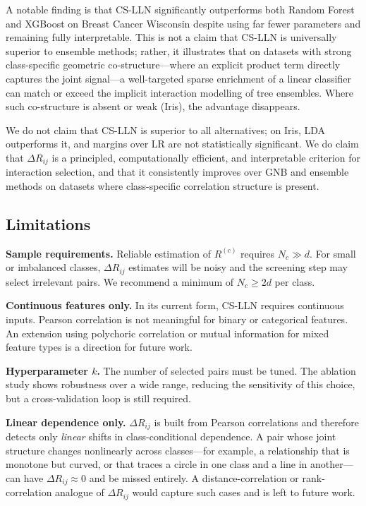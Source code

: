 \documentclass[conference]{IEEEtran}
\begin{document}
A notable finding is that CS-LLN significantly outperforms both Random
Forest and XGBoost on Breast Cancer Wisconsin despite using far fewer
parameters and remaining fully interpretable.
This is not a claim that CS-LLN is universally superior to ensemble methods;
rather, it illustrates that on datasets with strong class-specific geometric
co-structure---where an explicit product term directly captures the joint
signal---a well-targeted sparse enrichment of a linear classifier can match
or exceed the implicit interaction modelling of tree ensembles.
Where such co-structure is absent or weak (Iris), the advantage disappears.

We do not claim that CS-LLN is superior to all alternatives; on Iris, LDA
outperforms it, and margins over LR are not statistically significant.
We do claim that $\Delta R_{ij}$ is a principled, computationally efficient,
and interpretable criterion for interaction selection, and that it
consistently improves over GNB and ensemble methods on datasets where
class-specific correlation structure is present.

\subsection{Limitations}

\noindent\textbf{Sample requirements.}
Reliable estimation of $R^{(c)}$ requires $N_c \gg d$.
For small or imbalanced classes, $\Delta R_{ij}$ estimates will be noisy
and the screening step may select irrelevant pairs.
We recommend a minimum of $N_c \ge 2d$ per class.

\noindent\textbf{Continuous features only.}
In its current form, CS-LLN requires continuous inputs.
Pearson correlation is not meaningful for binary or categorical features.
An extension using polychoric correlation or mutual information for mixed
feature types is a direction for future work.

\noindent\textbf{Hyperparameter $k$.}
The number of selected pairs must be tuned.
The ablation study shows robustness over a wide range, reducing the
sensitivity of this choice, but a cross-validation loop is still required.

\noindent\textbf{Linear dependence only.}
$\Delta R_{ij}$ is built from Pearson correlations and therefore detects only
\emph{linear} shifts in class-conditional dependence. A pair whose joint
structure changes nonlinearly across classes---for example, a relationship
that is monotone but curved, or that traces a circle in one class and a line
in another---can have $\Delta R_{ij} \approx 0$ and be missed entirely. A
distance-correlation or rank-correlation analogue of $\Delta R_{ij}$ would
capture such cases and is left to future work.
\end{document}
